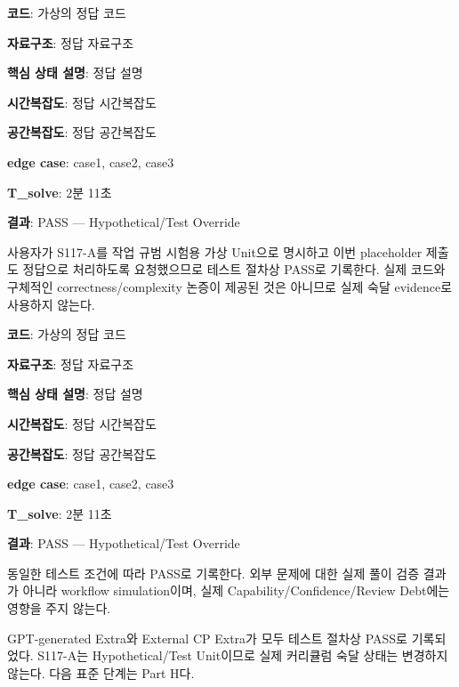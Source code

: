 \begin{answerbox}
\textbf{코드}: 가상의 정답 코드

\textbf{자료구조}: 정답 자료구조

\textbf{핵심 상태 설명}: 정답 설명

\textbf{시간복잡도}: 정답 시간복잡도

\textbf{공간복잡도}: 정답 공간복잡도

\textbf{edge case}: case1, case2, case3

\textbf{T\_solve}: 2분 11초
\end{answerbox}

\begin{notebox}[G-A 판정]
\textbf{결과}: PASS --- Hypothetical/Test Override

사용자가 S117-A를 작업 규범 시험용 가상 Unit으로 명시하고 이번 placeholder 제출도 정답으로 처리하도록 요청했으므로 테스트 절차상 PASS로 기록한다. 실제 코드와 구체적인 correctness/complexity 논증이 제공된 것은 아니므로 실제 숙달 evidence로 사용하지 않는다.
\end{notebox}

\begin{answerbox}
\textbf{코드}: 가상의 정답 코드

\textbf{자료구조}: 정답 자료구조

\textbf{핵심 상태 설명}: 정답 설명

\textbf{시간복잡도}: 정답 시간복잡도

\textbf{공간복잡도}: 정답 공간복잡도

\textbf{edge case}: case1, case2, case3

\textbf{T\_solve}: 2분 11초
\end{answerbox}

\begin{notebox}[G-B 판정]
\textbf{결과}: PASS --- Hypothetical/Test Override

동일한 테스트 조건에 따라 PASS로 기록한다. 외부 문제에 대한 실제 풀이 검증 결과가 아니라 workflow simulation이며, 실제 Capability/Confidence/Review Debt에는 영향을 주지 않는다.
\end{notebox}

\begin{notebox}[Part G 완료]
GPT-generated Extra와 External CP Extra가 모두 테스트 절차상 PASS로 기록되었다. S117-A는 Hypothetical/Test Unit이므로 실제 커리큘럼 숙달 상태는 변경하지 않는다. 다음 표준 단계는 Part H다.
\end{notebox}


